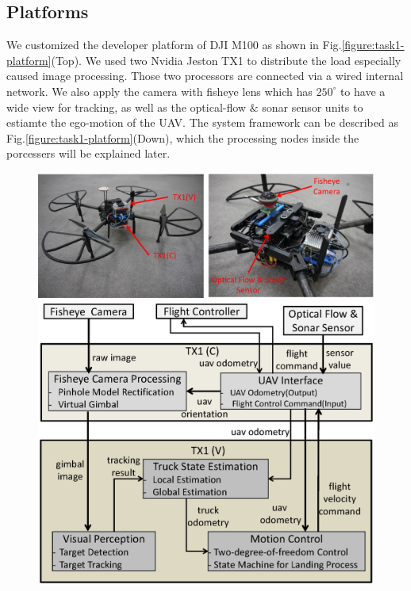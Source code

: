 \documentclass{standalone}
\begin{document}
\subsection{Platforms}
We customized the developer platform of DJI M100 as shown in Fig.\ref{figure:task1-platform}(Top). We used two Nvidia Jeston TX1 to distribute the load especially caused image processing. Those two processors are connected via a wired internal network.
We also apply the camera with fisheye lens which has $250^\circ$ to have a wide view for tracking, as well as the optical-flow $\&$ sonar sensor units to estiamte the ego-motion of the UAV. The system framework can be described as Fig.\ref{figure:task1-platform}(Down), which the processing nodes inside the porcessers will be explained later.

\begin{figure}[h]
    \begin{center}
        \begin{minipage}{\hsize}
          \begin{center}
      \includegraphics[clip, bb= 0 0 700 260, width=\columnwidth]{sections/task1/images/task1_hardware.eps}
          \end{center}
        \end{minipage}
        \begin{minipage}{1.0\hsize}
          \begin{center}
      \includegraphics[clip, bb= 0 0 525 440, width=0.9\columnwidth]{sections/task1/images/task1_framework.eps}

\end{center}
\end{minipage}
\end{center}
\end{figure}
\end{document}

